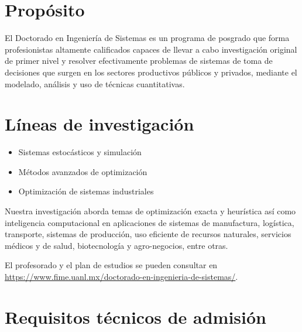 \documentclass[a0]{sciposter}
\begin{document}
\begin{multicols}{2} 

\section*{Propósito}

El Doctorado en Ingeniería de Sistemas es un programa de posgrado que
forma profesionistas altamente calificados capaces de llevar a cabo
investigación original de primer nivel y resolver efectivamente
problemas de sistemas de toma de decisiones que surgen en los sectores
productivos públicos y privados, mediante el modelado, análisis y uso
de técnicas cuantitativas.

\section*{Líneas de investigación}

\begin{itemize}
\item{Sistemas estocásticos y simulación}
\item{Métodos avanzados de optimización}
\item{Optimización de sistemas industriales}
\end{itemize}

Nuestra investigación aborda temas de optimización exacta y heurística
así como inteligencia computacional en aplicaciones de sistemas de
manufactura, logística, transporte, sistemas de producción, uso
eficiente de recursos naturales, servicios médicos y de salud,
biotecnología y agro-negocios, entre otras.

El profesorado y el plan de estudios se pueden consultar en
\url{https://www.fime.uanl.mx/doctorado-en-ingenieria-de-sistemas/}.

\section*{Requisitos técnicos de admisión}


\end{multicols}
\end{document}
